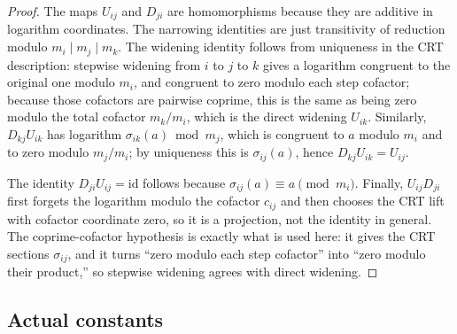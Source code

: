 \documentclass[11pt]{article}
\theoremstyle{plain}
\begin{document}
\begin{proof}
The maps \(U_{ij}\) and \(D_{ji}\) are homomorphisms because they are additive in
logarithm coordinates.  The narrowing identities are just transitivity of
reduction modulo
\(m_i\mid m_j\mid m_k\).  The widening identity follows from uniqueness in the
CRT description: stepwise widening from \(i\) to \(j\) to \(k\) gives a
logarithm congruent to the original one modulo \(m_i\), and congruent to zero
modulo each step cofactor; because those cofactors are pairwise coprime, this is
the same as being zero modulo the total cofactor \(m_k/m_i\), which is the
direct widening \(U_{ik}\).  Similarly, \(D_{kj}U_{ik}\) has logarithm
\(\sigma_{ik}(a)\bmod m_j\), which is congruent to \(a\) modulo \(m_i\) and to
zero modulo \(m_j/m_i\); by uniqueness this is \(\sigma_{ij}(a)\), hence
\(D_{kj}U_{ik}=U_{ij}\).

The identity \(D_{ji}U_{ij}=\mathrm{id}\) follows because
\(\sigma_{ij}(a)\equiv a\pmod {m_i}\).  Finally, \(U_{ij}D_{ji}\) first forgets
the logarithm modulo the cofactor \(c_{ij}\) and then chooses the CRT lift with
cofactor coordinate zero, so it is a projection, not the identity in general.
The coprime-cofactor hypothesis is exactly what is used here: it gives the CRT
sections \(\sigma_{ij}\), and it turns ``zero modulo each step cofactor'' into
``zero modulo their product,'' so stepwise widening agrees with direct widening.
\end{proof}

\subsection{Actual constants}
\end{document}
